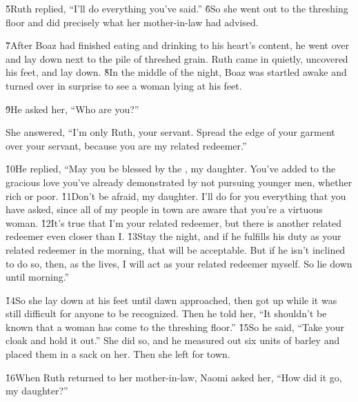 \v{5}Ruth replied, ``I'll do everything you've said.'' \v{6}So she went out to the threshing floor and did precisely what her mother-in-law had advised.

\v{7}After Boaz had finished eating and drinking to his heart's content, he went over and lay down next to the pile of threshed grain. Ruth came in quietly, uncovered his feet, and lay down. \v{8}In the middle of the night, Boaz was startled awake and turned over in surprise to see a woman lying at his feet.

\v{9}He asked her, ``Who are you?''

She answered, ``I'm only Ruth, your servant. Spread the edge of your garment over your servant, because you are my related redeemer.''

\v{10}He replied, ``May you be blessed by the , my daughter. You've added to the gracious love you've already demonstrated by not pursuing younger men, whether rich or poor. \v{11}Don't be afraid, my daughter. I'll do for you everything that you have asked, since all of my people in town are aware that you're a virtuous woman. \v{12}It's true that I'm your related redeemer, but there is another related redeemer even closer than I. \v{13}Stay the night, and if he fulfills his duty as your related redeemer in the morning, that will be acceptable. But if he isn't inclined to do so, then, as the  lives, I will act as your related redeemer myself. So lie down until morning.''

\v{14}So she lay down at his feet until dawn approached, then got up while it was still difficult for anyone to be recognized. Then he told her, ``It shouldn't be known that a woman has come to the threshing floor.'' \v{15}So he said, ``Take your cloak and hold it out.'' She did so, and he measured out six units of barley and placed them in a sack on her. Then she left for town.

\v{16}When Ruth returned to her mother-in-law, Naomi asked her, ``How did it go, my daughter?''

